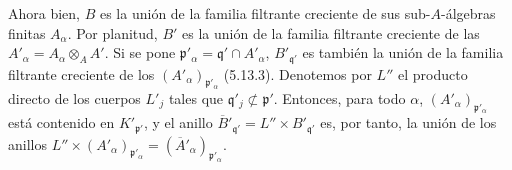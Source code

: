 Ahora bien, $B$ es la unión de la familia filtrante creciente de
sus sub-$A$-álgebras finitas $A_\alpha$. Por planitud, $B'$ es la
unión de la familia filtrante creciente de las
$A'_\alpha=A_\alpha\otimes_A A'$. Si se pone
$\mathfrak p'_\alpha=\mathfrak q'\cap A'_\alpha$,
$B'_{\mathfrak q'}$ es también la unión de la familia filtrante
creciente de los $(A'_\alpha)_{\mathfrak p'_\alpha}$ (5.13.3).
Denotemos por $L''$ el producto directo de los cuerpos $L'_j$ tales
que $\mathfrak q'_j\not\subset\mathfrak p'$. Entonces, para todo
$\alpha$, $(A'_\alpha)_{\mathfrak p'_\alpha}$ está contenido en
$K'_{\mathfrak p'}$, y el anillo
$\overline{B}'_{\mathfrak q'}=L''\times B'_{\mathfrak q'}$ es, por
tanto, la unión de los anillos
$L''\times(A'_\alpha)_{\mathfrak p'_\alpha}=
(\overline{A}'_\alpha)_{\mathfrak p'_\alpha}$.
